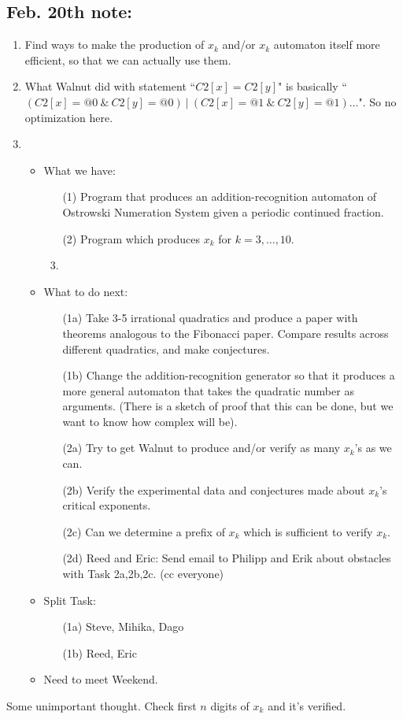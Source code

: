 \documentclass{article}
\theoremstyle{definition}
\theoremstyle{remark}
\theoremstyle{remark}
\theoremstyle{plain}
\theoremstyle{definition}
\begin{document}
\subsection{Feb. 20th note:}
\begin{enumerate}
    \item Find ways to make the production of $x_k$ and/or $x_k$ automaton itself more efficient, so that we can actually use them. 
    \item What Walnut did with statement ``$C2[x]=C2[y]$" is basically ``$(C2[x]=@0 ~\&~ C2[y]=@0)~ | ~(C2[x]=@1 ~\&~ C2[y]=@1) \dots $". So no optimization here. 
    \item \begin{itemize}
        \item What we have:  \begin{enumerate}
            \item[(1)] Program that produces an addition-recognition automaton of Ostrowski Numeration System given a periodic continued fraction.
            \item[(2)] Program which produces $x_k$ for $k= 3,\dots, 10$.
            \item 
        \end{enumerate}
        \item What to do next: \begin{enumerate}
            \item[(1a)] Take 3-5 irrational quadratics and produce a paper with theorems analogous to the Fibonacci paper. Compare results across different quadratics, and make conjectures.
            \item[(1b)] Change the addition-recognition generator so that it produces a more general automaton that takes the quadratic number as arguments. (There is a sketch of proof that this can be done, but we want to know how complex will be).
            \item[(2a)] Try to get Walnut to produce and/or verify as many $x_k$'s as we can.
            \item[(2b)] Verify the experimental data and conjectures made about $x_k$'s critical exponents. 
            \item[(2c)] Can we determine a prefix of $x_k$ which is sufficient to verify $x_k$. 
            \item[(2d)] Reed and Eric: Send email to Philipp and Erik about obstacles with Task 2a,2b,2c. (cc everyone)
        \end{enumerate}
        \item Split Task: \begin{enumerate}
            \item[(1a)] Steve, Mihika, Dago
            \item[(1b)] Reed, Eric
        \end{enumerate}
        \item Need to meet Weekend. 
    \end{itemize}
\end{enumerate}
Some unimportant thought. 
Check first $n$ digits of $x_k$ and it's verified. 
\end{document}
